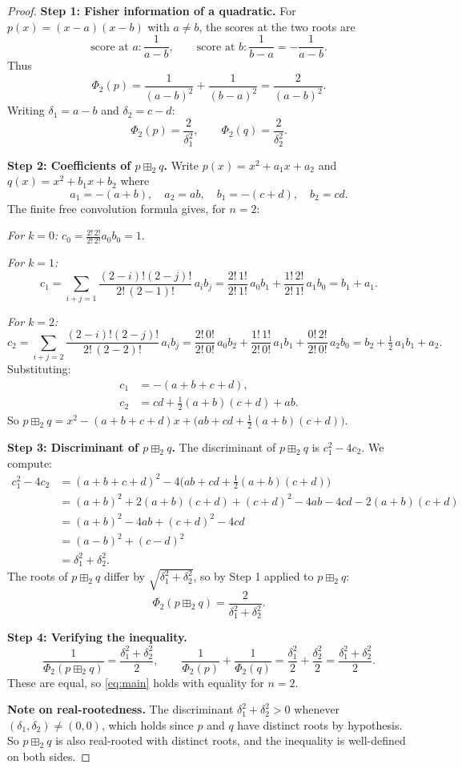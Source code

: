 \documentclass[12pt]{article}
\theoremstyle{definition}
\begin{document}
\begin{proof}
\textbf{Step 1: Fisher information of a quadratic.}
For $p(x) = (x-a)(x-b)$ with $a \neq b$, the scores at the two roots are
\[
\text{score at } a: \frac{1}{a-b}, \qquad \text{score at } b: \frac{1}{b-a} = -\frac{1}{a-b}.
\]
Thus
\[
\Phi_2(p) = \frac{1}{(a-b)^2} + \frac{1}{(b-a)^2} = \frac{2}{(a-b)^2}.
\]
Writing $\delta_1 = a - b$ and $\delta_2 = c - d$:
\[
\Phi_2(p) = \frac{2}{\delta_1^2}, \qquad \Phi_2(q) = \frac{2}{\delta_2^2}.
\]

\textbf{Step 2: Coefficients of $p \boxplus_2 q$.}
Write $p(x) = x^2 + a_1 x + a_2$ and $q(x) = x^2 + b_1 x + b_2$ where
\[
a_1 = -(a+b),\quad a_2 = ab,\quad b_1 = -(c+d),\quad b_2 = cd.
\]
The finite free convolution formula gives, for $n = 2$:

\emph{For $k = 0$:} $c_0 = \frac{2!\,2!}{2!\,2!}a_0 b_0 = 1$.

\emph{For $k = 1$:}
\[
c_1 = \sum_{i+j=1} \frac{(2-i)!(2-j)!}{2!\,(2-1)!}\,a_i b_j
= \frac{2!\,1!}{2!\,1!}\,a_0 b_1 + \frac{1!\,2!}{2!\,1!}\,a_1 b_0
= b_1 + a_1.
\]

\emph{For $k = 2$:}
\[
c_2 = \sum_{i+j=2} \frac{(2-i)!(2-j)!}{2!\,(2-2)!}\,a_i b_j
= \frac{2!\,0!}{2!\,0!}\,a_0 b_2 + \frac{1!\,1!}{2!\,0!}\,a_1 b_1 + \frac{0!\,2!}{2!\,0!}\,a_2 b_0
= b_2 + \tfrac{1}{2}\,a_1 b_1 + a_2.
\]
Substituting:
\begin{align*}
c_1 &= -(a+b+c+d), \\
c_2 &= cd + \tfrac{1}{2}(a+b)(c+d) + ab.
\end{align*}
So $p \boxplus_2 q = x^2 - (a+b+c+d)x + \bigl(ab + cd + \tfrac{1}{2}(a+b)(c+d)\bigr)$.

\textbf{Step 3: Discriminant of $p \boxplus_2 q$.}
The discriminant of $p \boxplus_2 q$ is $c_1^2 - 4c_2$. We compute:
\begin{align*}
c_1^2 - 4c_2
&= (a+b+c+d)^2 - 4\bigl(ab + cd + \tfrac{1}{2}(a+b)(c+d)\bigr) \\
&= (a+b)^2 + 2(a+b)(c+d) + (c+d)^2 - 4ab - 4cd - 2(a+b)(c+d) \\
&= (a+b)^2 - 4ab + (c+d)^2 - 4cd \\
&= (a-b)^2 + (c-d)^2 \\
&= \delta_1^2 + \delta_2^2.
\end{align*}
The roots of $p \boxplus_2 q$ differ by $\sqrt{\delta_1^2 + \delta_2^2}$, so by Step 1 applied to $p \boxplus_2 q$:
\[
\Phi_2(p \boxplus_2 q) = \frac{2}{\delta_1^2 + \delta_2^2}.
\]

\textbf{Step 4: Verifying the inequality.}
\[
\frac{1}{\Phi_2(p \boxplus_2 q)} = \frac{\delta_1^2 + \delta_2^2}{2},
\qquad
\frac{1}{\Phi_2(p)} + \frac{1}{\Phi_2(q)} = \frac{\delta_1^2}{2} + \frac{\delta_2^2}{2} = \frac{\delta_1^2 + \delta_2^2}{2}.
\]
These are equal, so \eqref{eq:main} holds with equality for $n = 2$.

\medskip
\noindent\textbf{Note on real-rootedness.} The discriminant $\delta_1^2 + \delta_2^2 > 0$ whenever $(\delta_1, \delta_2) \neq (0,0)$, which holds since $p$ and $q$ have distinct roots by hypothesis. So $p \boxplus_2 q$ is also real-rooted with distinct roots, and the inequality is well-defined on both sides.
\end{proof}
\end{document}
